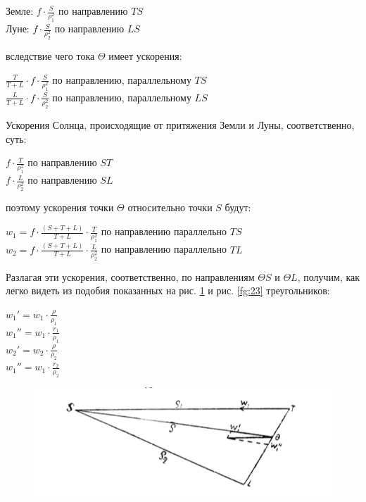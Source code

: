 \documentclass[a4paper,12pt]{article}
\begin{document}
\begin{center}
	Земле: $f \cdot \frac{S}{\rho_1^2}$ по направлению $TS$ \\
	Луне: $f \cdot \frac{S}{\rho_2^2}$ по направлению $LS$
\end{center}

вследствие чего тока $\Theta$ имеет ускорения:
\begin{center}
	$\frac{T}{T+L} \cdot f \cdot 	\frac{S}{\rho_1^2}$ по направлению, параллельному $TS$ \\
	$\frac{L}{T+L} \cdot f \cdot 	\frac{S}{\rho_2^2}$ по направлению, параллельному $LS$
\end{center}

Ускорения Солнца, происходящие от притяжения Земли и Луны, соответственно, суть:

\begin{center}
$f \cdot \frac{T}{\rho_1^2}$ по направлению $ST$ \\
$f \cdot \frac{L}{\rho_2^2}$ по направлению $SL$ \\
\end{center}

поэтому ускорения точки $\Theta$ относительно точки $S$ будут:
\begin{center}
	$w_1=f \cdot \frac{(S+T+L)}{T+L} \cdot \frac{T}{\rho_1^2}$ по направлению параллельно $TS$ \\
	$w_2=f \cdot \frac{(S+T+L)}{T+L} \cdot \frac{L}{\rho_2^2}$ по направлению параллельно $TL$ 
\end{center}

Разлагая эти ускорения, соответственно, по направлениям $\Theta S$ и $\Theta L$, получим, как легко видеть из подобия показанных на рис. \ref{fg:22} и рис. \ref{fg:23} треугольников:

\begin{center}
$w_1'=w_1 \cdot \frac{\rho}{\rho_1}$ \\
$w_1''=w_1 \cdot \frac{r_1}{\rho_1}$\\
$w_2'=w_2 \cdot \frac{\rho}{\rho_2}$\\
$w_1''=w_1 \cdot \frac{r_2}{\rho_2}$\\
\end{center}

\begin{figure}[bhtp]
	\caption{}
	\label{fg:22}
	\includegraphics{22.png}
\end{figure}
\end{document}
